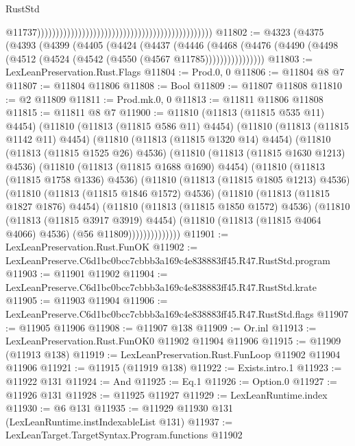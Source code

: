 \begin{lexlean}{RustStd}
\begin{coremodule}
                                                                                                  @11737)))))))))))))))))))))))))))))))))))))))))))))))
@11802 := @4323
    (@4375
      (@4393
        (@4399
          (@4405
            (@4424
              (@4437
                (@4446
                  (@4468
                    (@4476 (@4490 (@4498 (@4512 (@4524 (@4542 (@4550 (@4567 @11785))))))))))))))))
@11803 := LexLeanPreservation.Rust.Flags
@11804 := Prod.{0, 0}
@11806 := @11804 @8 @7
@11807 := @11804 @11806
@11808 := Bool
@11809 := @11807 @11808
@11810 := @2 @11809
@11811 := Prod.mk.{0, 0}
@11813 := @11811 @11806 @11808
@11815 := @11811 @8 @7
@11900 := @11810
    (@11813 (@11815 @535 @11) @4454)
    (@11810
      (@11813 (@11815 @586 @11) @4454)
      (@11810
        (@11813 (@11815 @1142 @11) @4454)
        (@11810
          (@11813 (@11815 @1320 @14) @4454)
          (@11810
            (@11813 (@11815 @1525 @26) @4536)
            (@11810
              (@11813 (@11815 @1630 @1213) @4536)
              (@11810
                (@11813 (@11815 @1688 @1690) @4454)
                (@11810
                  (@11813 (@11815 @1758 @1336) @4536)
                  (@11810
                    (@11813 (@11815 @1805 @1213) @4536)
                    (@11810
                      (@11813 (@11815 @1846 @1572) @4536)
                      (@11810
                        (@11813 (@11815 @1827 @1876) @4454)
                        (@11810
                          (@11813 (@11815 @1850 @1572) @4536)
                          (@11810
                            (@11813 (@11815 @3917 @3919) @4454)
                            (@11810 (@11813 (@11815 @4064 @4066) @4536) (@56 @11809))))))))))))))
@11901 := LexLeanPreservation.Rust.FunOK
@11902 := LexLeanPreserve.C6d1bc0bcc7cbbb3a169c4e838883ff45.R47.RustStd.program
@11903 := @11901 @11902
@11904 := LexLeanPreserve.C6d1bc0bcc7cbbb3a169c4e838883ff45.R47.RustStd.krate
@11905 := @11903 @11904
@11906 := LexLeanPreserve.C6d1bc0bcc7cbbb3a169c4e838883ff45.R47.RustStd.flags
@11907 := @11905 @11906
@11908 := @11907 @138
@11909 := Or.inl
@11913 := LexLeanPreservation.Rust.FunOK0 @11902 @11904 @11906
@11915 := @11909 (@11913 @138)
@11919 := LexLeanPreservation.Rust.FunLoop @11902 @11904 @11906
@11921 := @11915 (@11919 @138)
@11922 := Exists.intro.{1}
@11923 := @11922 @131
@11924 := And
@11925 := Eq.{1}
@11926 := Option.{0}
@11927 := @11926 @131
@11928 := @11925 @11927
@11929 := LexLeanRuntime.index
@11930 := @6 @131
@11935 := @11929 @11930 @131 (LexLeanRuntime.instIndexableList @131)
@11937 := LexLeanTarget.TargetSyntax.Program.functions @11902

\end{coremodule}
\end{lexlean}
